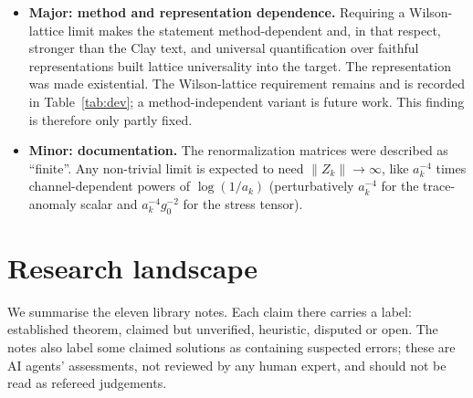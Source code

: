 \documentclass[11pt]{article}
\theoremstyle{definition}
\theoremstyle{remark}
\newcommand{\lean}[1]{\texttt{\hyphenchar\font=-1\relax #1}}
\begin{document}
\begin{itemize}[leftmargin=*]
  asymptotic freedom had no formal counterpart. Added \lean{ShortDistanceAF}, a scalar two-point
  fingerprint. The stress-tensor and OPE parts of the requirement remain unformalized and are
  recorded in Table~\ref{tab:dev}; this finding is therefore also only partly fixed.
\item \textbf{Major: method and representation dependence.} Requiring a Wilson-lattice limit makes
  the statement method-dependent and, in that respect, stronger than the Clay text, and universal
  quantification over faithful representations built lattice universality into the target. The
  representation was made existential. The Wilson-lattice requirement remains and is recorded in
  Table~\ref{tab:dev}; a method-independent variant is future work. This finding is therefore only
  partly fixed.
\item \textbf{Minor: documentation.} The renormalization matrices were described as ``finite''.
  Any non-trivial limit is expected to need $\|Z_k\|\to\infty$, like $a_k^{-4}$ times
  channel-dependent powers of $\log(1/a_k)$ (perturbatively $a_k^{-4}$ for the trace-anomaly scalar
  and $a_k^{-4}g_0^{-2}$ for the stress tensor).
\end{itemize}

\section{Research landscape}\label{sec:landscape}

We summarise the eleven library notes. Each claim there carries a label: established theorem,
claimed but unverified, heuristic, disputed or open. The notes also label some claimed solutions as
containing suspected errors; these are AI agents' assessments, not reviewed by any human expert,
and should not be read as refereed judgements.
\end{document}
